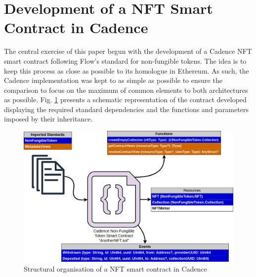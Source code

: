 \documentclass[../NFTComp_IEEE.tex]{subfiles}
\begin{document}
\section{Development of a NFT Smart Contract in Cadence}
\label{sec:cadence_development}
The central exercise of this paper begun with the development of a Cadence NFT smart contract following Flow's standard for non-fungible tokens. The idea is to keep this process as close as possible to its homologue in Ethereum. As such, the Cadence implementation was kept to as simple as possible to ensure the comparison to focus on the maximum of common elements to both architectures as possible. Fig. \ref{fig:cadence_nft_contract} presents a schematic representation of the contract developed displaying the required standard dependencies and the functions and parameters imposed by their inheritance.

\begin{figure}[h!]
    \centering
    \includegraphics[width=\columnwidth]{Images/almei1.png}
    \caption{Structural organisation of a NFT smart contract in Cadence}
    \label{fig:cadence_nft_contract}
\end{figure}
\end{document}
